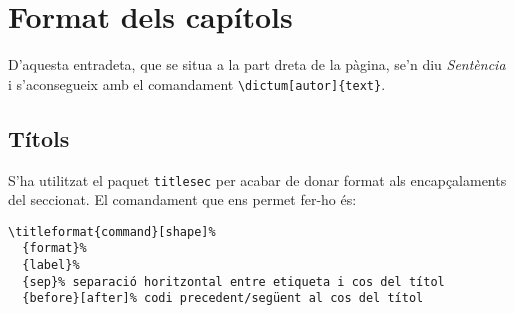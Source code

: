 \documentclass[a4paper,%
                             twoside,%
                             BCOR1.0cm,%
                             DIV11,%
                             parskip=full,%
                             11pt]{scrbook}
\begin{document}
\title{}
\author{
    \\http://phobos.xtec.cat/jqueralt
}
\date{\today}

\maketitle
\tableofcontents

\chapter{Format dels capítols}\label{cap:primer}

D'aquesta entradeta, que se situa a la part dreta de la pàgina, se'n diu \textit{Sentència} i s'aconsegueix amb el comandament \verb+\dictum[autor]{text}+.
\section{Títols}\label{sec:titols}
S'ha utilitzat el paquet \verb+titlesec+ per acabar de donar format als encapçalaments del seccionat. El comandament que ens permet fer-ho és:
\begin{scriptsize}
\begin{verbatim}
\titleformat{command}[shape]%
  {format}%
  {label}%
  {sep}% separació horitzontal entre etiqueta i cos del títol
  {before}[after]% codi precedent/següent al cos del títol
\end{verbatim}
\end{scriptsize}

\end{document}
